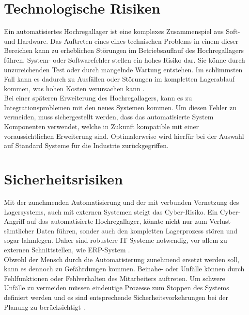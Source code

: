 \section{Technologische Risiken}
Ein automatisiertes Hochregallager ist eine komplexes Zusammenspiel aus Soft- und Hardware. Das Auftreten eines eines technischen Problems in einem dieser Bereichen kann zu erheblichen Störungen im Betriebsauflauf des Hochregallagers führen.
System- oder Softwarefehler stellen ein hohes Risiko dar. Sie könne durch unzureichenden Test oder durch mangelnde Wartung entstehen. Im schlimmsten Fall kann es dadurch zu Ausfällen oder Störungen im kompletten Lagerablauf kommen, was hohen Kosten verursachen kann \autocite{hartel_projektmanagement_2019}.\\
Bei einer späteren Erweiterung des Hochregallagers, kann es zu Integrationsproblemen mit den neues Systemen kommen. Um diesen Fehler zu vermeiden, muss sichergestellt werden, dass das automatisierte System Komponenten verwendet, welche in Zukunft kompatible mit einer voraussichtlichen Erweiterung sind. Optimalerweise wird hierfür bei der Auswahl auf Standard Systeme für die Industrie zurückgegriffen.
\section{Sicherheitsrisiken}
Mit der zunehmenden Automatisierung und der mit verbunden Vernetzung des Lagersystems, auch mit externen Systemen steigt das Cyber-Risiko. Ein Cyber-Angriff auf das automatisierte Hochregallager, könnte nicht nur zum Verlust sämtlicher Daten führen, sonder auch den kompletten Lagerprozess stören und sogar lahmlegen. Daher sind robustere IT-Systeme notwendig, vor allem zu externen Schnittstellen, wie ERP-System \autocite{haumer_it-sicherheit_2015}.\\
Obwohl der Mensch durch die Automatisierung zunehmend ersetzt werden soll, kann es dennoch zu Gefährdungen kommen. Beinahe- oder Unfälle können durch Fehlfunktionen oder Fehlverhalten des Mitarbeiters auftreten. Um schwere Unfälle zu vermeiden müssen eindeutige Prozesse zum Stoppen des Systems definiert werden und es sind entsprechende Sicherheitsvorkehrungen bei der Planung zu berücksichtigt .
 
